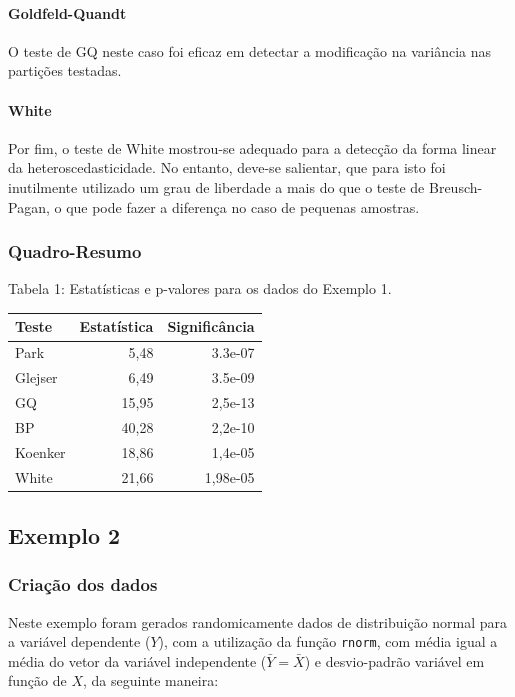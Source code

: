 \documentclass[a4paper, 12pt]{article}
\let\oldparagraph\paragraph
\renewcommand{\paragraph}[1]{\oldparagraph{#1}\mbox{}}
\let\code=\texttt
\begin{document}
\hypertarget{goldfeld-quandt}{%
\paragraph{Goldfeld-Quandt}\label{goldfeld-quandt}}

O teste de GQ neste caso foi eficaz em detectar a modificação na
variância nas partições testadas.

\hypertarget{white}{%
\paragraph{White}\label{white}}

Por fim, o teste de White mostrou-se adequado para a detecção da forma
linear da heteroscedasticidade. No entanto, deve-se salientar, que para
isto foi inutilmente utilizado um grau de liberdade a mais do que o
teste de Breusch-Pagan, o que pode fazer a diferença no caso de pequenas
amostras.

\hypertarget{quadro-resumo}{%
\subsubsection{Quadro-Resumo}\label{quadro-resumo}}

\centerline{Tabela 1: Estatísticas e p-valores para os dados do Exemplo 1.}

\begin{longtable}[]{@{}lrr@{}}
\toprule
Teste & Estatística & Significância\tabularnewline
\midrule
\endhead
Park & 5,48 & 3.3e-07\tabularnewline
Glejser & 6,49 & 3.5e-09\tabularnewline
GQ & 15,95 & 2,5e-13\tabularnewline
BP & 40,28 & 2,2e-10\tabularnewline
Koenker & 18,86 & 1,4e-05\tabularnewline
White & 21,66 & 1,98e-05\tabularnewline
\bottomrule
\end{longtable}

\hypertarget{exemplo-2}{%
\subsection{Exemplo 2}\label{exemplo-2}}

\hypertarget{criacao-dos-dados-1}{%
\subsubsection{Criação dos dados}\label{criacao-dos-dados-1}}

Neste exemplo foram gerados randomicamente dados de distribuição normal
para a variável dependente (\(Y\)), com a utilização da função
\code{rnorm}, com média igual a média do vetor da variável independente
(\(\bar{Y} = \bar{X}\)) e desvio-padrão variável em função de \(X\), da
seguinte maneira:
\end{document}
